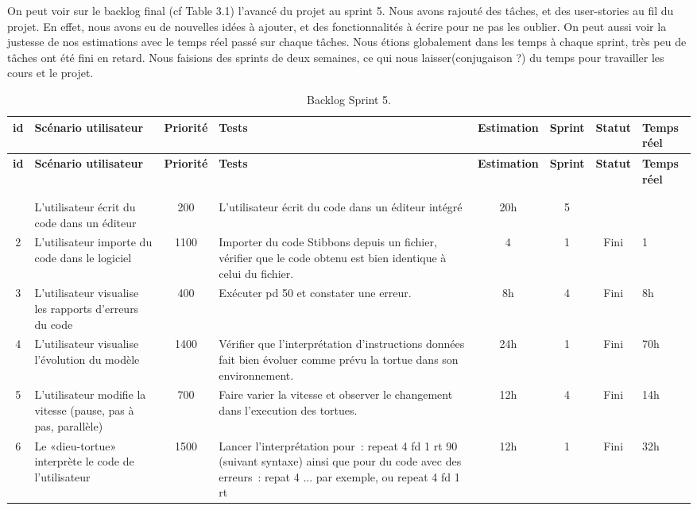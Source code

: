 On peut voir sur le backlog final (cf Table 3.1) l'avancé du projet au sprint 5.
Nous avons rajouté des tâches, et des user-stories au fil du projet. En effet, nous avons eu de nouvelles idées à ajouter, et des fonctionnalités à écrire pour ne pas les oublier.
On peut aussi voir la justesse de nos estimations avec le temps réel passé sur chaque tâches.
Nous étions globalement dans les temps à chaque sprint, très peu de tâches ont été fini en retard.
Nous faisions des sprints de deux semaines, ce qui nous laisser(conjugaison ?) du temps pour travailler les cours et le projet.

{\tiny
\begin{longtable}[c]{|c|p{1.3cm}|c|p{3.5cm}|*{3}{c|}p{0.7cm}|}
\hline
\bf id & \bf Scénario utilisateur & \bf Priorité & \bf Tests & \bf Estimation & \bf Sprint & \bf Statut & \bf Temps réel \\
\hline
\endfirsthead
\hline
\bf id & \bf Scénario utilisateur & \bf Priorité & \bf Tests & \bf Estimation & \bf Sprint & \bf Statut & \bf Temps réel \\
\hline
\endhead
\hline
\caption{Backlog Sprint 5 (fin).} \label{bsp5}\\
\endlastfoot
\hline
\caption[]{Backlog Sprint 5.}\\
\endfoot
1 & L'utilisateur écrit du code dans un éditeur & 200 & L'utilisateur écrit du code dans un éditeur intégré & 20h & 5 &  &  \\
\hline
2 & L'utilisateur importe du code dans le logiciel & 1100 & Importer du code Stibbons depuis un fichier, vérifier que le code obtenu est bien identique à celui du fichier. & 4 & 1 & Fini & 1 \\
\hline
3 & L'utilisateur visualise les rapports d'erreurs du code & 400 & Exécuter pd 50 et constater une erreur. & 8h & 4 & Fini & 8h \\
\hline
4 & L'utilisateur visualise l'évolution du modèle & 1400 & Vérifier que l'interprétation d'instructions données fait bien évoluer comme prévu la tortue dans son environnement. & 24h & 1 & Fini & 70h \\
\hline
5 & L'utilisateur modifie la vitesse (pause, pas à pas, parallèle) & 700 & Faire varier la vitesse et observer le changement dans l'execution des tortues. & 12h & 4 & Fini & 14h \\
\hline
6 & Le «dieu-tortue» interprète le code de l'utilisateur & 1500 & Lancer l'interprétation pour~: repeat 4 { fd 1 rt 90 } (suivant syntaxe) ainsi que pour du code avec des erreurs~: repat 4 {...} par exemple, ou repeat 4 { fd 1 rt } & 12h & 1 & Fini & 32h \\

\end{longtable}}
